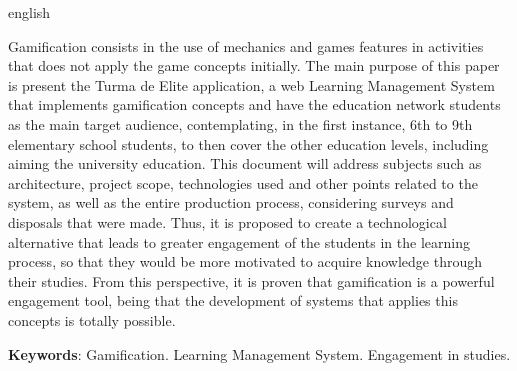 \documentclass[
    12pt,               %
    openright,          %
    oneside,
    a4paper,            %
    english,            %
    brazil              %
    ]{ifsp-spo-inf-ctds} %
\begin{document}
\begin{resumo}[Abstract]
 \begin{otherlanguage*}{english}
 
    \vspace{\onelineskip}
 
     Gamification consists in the use of mechanics and games features in activities that does not apply the game concepts initially. The main purpose of this paper is present the Turma de Elite application, a web Learning Management System that implements gamification concepts and have the education network students as the main target audience, contemplating, in the first instance, 6th to 9th elementary school students, to then cover the other education levels, including aiming the university education.
     This document will address subjects such as architecture, project scope, technologies used and other points related to the system, as well as the entire production process, considering surveys and disposals that were made.
     Thus, it is proposed to create a technological alternative that leads to greater engagement of the students in the learning process, so that they would be more motivated to acquire knowledge through their studies. From this perspective, it is proven that gamification is a powerful engagement tool, being that the development of systems that applies this concepts is totally possible.
     
   \vspace{\onelineskip}
   \noindent 
   \textbf{Keywords}: Gamification. Learning Management System. Engagement in studies.
 \end{otherlanguage*}
\end{resumo}
\listoffigures*
\cleardoublepage

\listoftables*
\cleardoublepage

\listofquadros*
\cleardoublepage

\ifdef{\printnoidxglossary}{
    \printnoidxglossary[type=\acronymtype,title=Lista de abreviaturas e siglas,style=siglas]
    \cleardoublepage
}{}

\tableofcontents*
\end{document}
